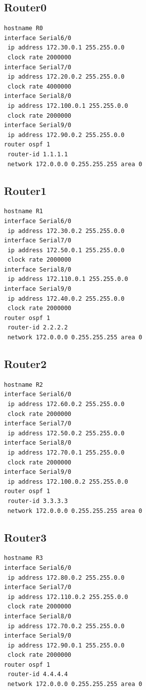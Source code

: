 \subsection*{Router0}
\begin{lstlisting}
hostname R0
interface Serial6/0
 ip address 172.30.0.1 255.255.0.0
 clock rate 2000000
interface Serial7/0
 ip address 172.20.0.2 255.255.0.0
 clock rate 4000000
interface Serial8/0
 ip address 172.100.0.1 255.255.0.0
 clock rate 2000000
interface Serial9/0
 ip address 172.90.0.2 255.255.0.0
router ospf 1
 router-id 1.1.1.1
 network 172.0.0.0 0.255.255.255 area 0
\end{lstlisting}
\subsection*{Router1}
\begin{lstlisting}
hostname R1
interface Serial6/0
 ip address 172.30.0.2 255.255.0.0
interface Serial7/0
 ip address 172.50.0.1 255.255.0.0
 clock rate 2000000
interface Serial8/0
 ip address 172.110.0.1 255.255.0.0
interface Serial9/0
 ip address 172.40.0.2 255.255.0.0
 clock rate 2000000
router ospf 1
 router-id 2.2.2.2
 network 172.0.0.0 0.255.255.255 area 0
\end{lstlisting}
\subsection*{Router2}
\begin{lstlisting}
hostname R2
interface Serial6/0
 ip address 172.60.0.2 255.255.0.0
 clock rate 2000000
interface Serial7/0
 ip address 172.50.0.2 255.255.0.0
interface Serial8/0
 ip address 172.70.0.1 255.255.0.0
 clock rate 2000000
interface Serial9/0
 ip address 172.100.0.2 255.255.0.0
router ospf 1
 router-id 3.3.3.3
 network 172.0.0.0 0.255.255.255 area 0
\end{lstlisting}
\subsection*{Router3}
\begin{lstlisting}
hostname R3
interface Serial6/0
 ip address 172.80.0.2 255.255.0.0
interface Serial7/0
 ip address 172.110.0.2 255.255.0.0
 clock rate 2000000
interface Serial8/0
 ip address 172.70.0.2 255.255.0.0
interface Serial9/0
 ip address 172.90.0.1 255.255.0.0
 clock rate 2000000
router ospf 1
 router-id 4.4.4.4
 network 172.0.0.0 0.255.255.255 area 0
\end{lstlisting}
